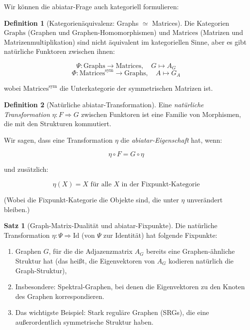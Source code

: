 \documentclass[a4paper,12pt]{article}
\theoremstyle{definition}
\newtheorem{definition}{Definition}
\newtheorem{satz}{Satz}
\begin{document}
Wir können die abiatar-Frage auch kategoriell formulieren:

\begin{definition}[Kategorienäquivalenz: Graphs $\simeq$ Matrices]
Die Kategorien $\text{Graphs}$ (Graphen und Graphen-Homomorphismen) und $\text{Matrices}$ (Matrizen und Matrizenmultiplikation) sind nicht äquivalent im kategoriellen Sinne, aber es gibt natürliche Funktoren zwischen ihnen:

$$\Psi: \text{Graphs} \to \text{Matrices}, \quad G \mapsto A_G$$
$$\Phi: \text{Matrices}^{\text{sym}} \to \text{Graphs}, \quad A \mapsto G_A$$

wobei $\text{Matrices}^{\text{sym}}$ die Unterkategorie der symmetrischen Matrizen ist.
\end{definition}

\begin{definition}[Natürliche abiatar-Transformation]
Eine \textit{natürliche Transformation} $\eta: F \Rightarrow G$ zwischen Funktoren ist eine Familie von Morphismen, die mit den Strukturen kommutiert.

Wir sagen, dass eine Transformation $\eta$ die \textit{abiatar-Eigenschaft} hat, wenn:

$$\eta \circ F = G \circ \eta$$

und zusätzlich:

$$\eta(X) = X \text{ für alle } X \text{ in der Fixpunkt-Kategorie}$$

(Wobei die Fixpunkt-Kategorie die Objekte sind, die unter $\eta$ unverändert bleiben.)
\end{definition}

\begin{satz}[Graph-Matrix-Dualität und abiatar-Fixpunkte]
Die natürliche Transformation $\eta: \Psi \Rightarrow \text{Id}$ (von $\Psi$ zur Identität) hat folgende Fixpunkte:

\begin{enumerate}
\item Graphen $G$, für die die Adjazenzmatrix $A_G$ bereits eine Graphen-ähnliche Struktur hat (das heißt, die Eigenvektoren von $A_G$ kodieren natürlich die Graph-Struktur),

\item Insbesondere: Spektral-Graphen, bei denen die Eigenvektoren zu den Knoten des Graphen korrespondieren.

\item Das wichtigste Beispiel: Stark reguläre Graphen (SRGs), die eine außerordentlich symmetrische Struktur haben.
\end{enumerate}
\end{satz}
\end{document}
